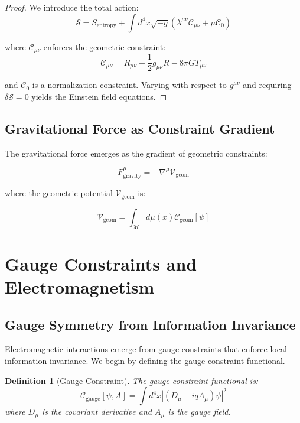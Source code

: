 \documentclass[11pt,a4paper]{article}
\newtheorem{definition}[theorem]{Definition}
\begin{document}
\begin{proof}
We introduce the total action:
\begin{equation}
\mathcal{S} = S_{\text{entropy}} + \int d^4x \sqrt{-g} \left( \lambda^{\mu\nu} \mathcal{C}_{\mu\nu} + \mu \mathcal{C}_0 \right)
\end{equation}

where $\mathcal{C}_{\mu\nu}$ enforces the geometric constraint:
\begin{equation}
\mathcal{C}_{\mu\nu} = R_{\mu\nu} - \frac{1}{2} g_{\mu\nu} R - 8\pi G T_{\mu\nu}
\end{equation}

and $\mathcal{C}_0$ is a normalization constraint. Varying with respect to $g^{\mu\nu}$ and requiring $\delta \mathcal{S} = 0$ yields the Einstein field equations.
\end{proof}

\subsection{Gravitational Force as Constraint Gradient}

The gravitational force emerges as the gradient of geometric constraints:

\begin{equation}
F_{\text{gravity}}^{\mu} = -\nabla^{\mu} \mathcal{V}_{\text{geom}}
\end{equation}

where the geometric potential $\mathcal{V}_{\text{geom}}$ is:

\begin{equation}
\mathcal{V}_{\text{geom}} = \int_{\mathcal{M}} d\mu(x) \mathcal{C}_{\text{geom}}[\psi]
\end{equation}

\section{Gauge Constraints and Electromagnetism}

\subsection{Gauge Symmetry from Information Invariance}

Electromagnetic interactions emerge from gauge constraints that enforce local information invariance. We begin by defining the gauge constraint functional.

\begin{definition}[Gauge Constraint]
The gauge constraint functional is:
\begin{equation}
\mathcal{C}_{\text{gauge}}[\psi, A] = \int d^4x \left| (D_{\mu} - iqA_{\mu})\psi \right|^2
\end{equation}
where $D_{\mu}$ is the covariant derivative and $A_{\mu}$ is the gauge field.
\end{definition}
\end{document}
